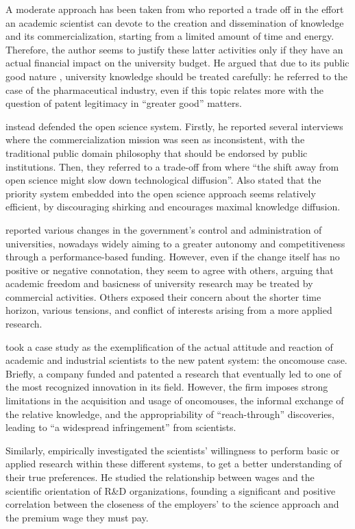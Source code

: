 A moderate approach has been taken from \citet{Beath2000} who reported a trade off in the effort an academic scientist can devote to the creation and dissemination of knowledge and its commercialization, starting from a limited amount of time and energy. Therefore, the author seems to justify these latter activities only if they have an actual financial impact on the university budget. He argued that due to its public good nature \citep{Muscio2013}, university knowledge should be treated carefully: he referred to the case of the pharmaceutical industry, even if this topic relates more with the question of patent legitimacy in \enquote{greater good} matters.

\citet{Siegel2003a} instead defended the open science system. Firstly, he reported several interviews where the commercialization mission was seen as inconsistent, with the traditional public domain philosophy that should be endorsed by public institutions. Then, they referred to a trade-off from \citet{Nelson2001} where \enquote{the shift away from open science might slow down technological diffusion}. Also \citet{Stern2004} stated that the priority system embedded into the open science approach seems relatively efficient, by discouraging shirking and encourages maximal knowledge diffusion.

\citet{Rasmussen2006} reported various changes in the government's control and administration of universities, nowadays widely aiming to a greater autonomy and competitiveness through a performance-based funding. However, even if the change itself has no positive or negative connotation, they seem to agree with others, arguing that academic freedom and basicness of university research may be treated by commercial activities. Others exposed their concern about the shorter time horizon, various tensions, and conflict of interests arising from a more applied research. 

\citet{Murray2005} took a case study as the exemplification of the actual attitude and reaction of academic and industrial scientists to the new patent system: the oncomouse case. Briefly, a company funded and patented a research that eventually led to one of the most recognized innovation in its field. However, the firm imposes strong limitations in the acquisition and usage of oncomouses, the informal exchange of the relative knowledge, and the appropriability of \enquote{reach-through} discoveries, leading to \enquote{a widespread infringement} from scientists. 

Similarly, \citet{Stern2004} empirically investigated the scientists' willingness to perform basic or applied research within these different systems, to get a better understanding of their true preferences. He studied the relationship between wages and the scientific orientation of R\&D organizations, founding a significant and positive correlation between the closeness of the employers' to the science approach and the premium wage they must pay.

